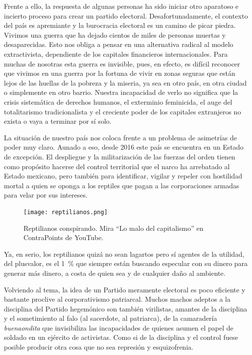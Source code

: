 Frente a ello, la respuesta de algunas personas ha sido iniciar otro aparatoso e incierto proceso para crear un partido electoral. Desafortunadamente, el contexto del país es apremiante y la burocracia electoral es un camino de picar piedra. Vivimos una guerra que ha dejado cientos de miles de personas muertas y desaparecidas. Esto nos obliga a pensar en una alternativa radical al modelo extractivista, dependiente de los capitales financieros internacionales. Para muchas de nosotras esta guerra es invisible, pues, en efecto, es difícil reconocer que vivimos en una guerra por la fortuna de vivir en zonas seguras que están lejos de las huellas de la pobreza y la miseria, ya sea en otro país, en otra ciudad o simplemente en otro barrio. Nuestra incapacidad de verlo no significa que la crisis sistemática de derechos humanos, el exterminio feminicida, el auge del totalitarismo tradicionalista y el creciente poder de los capitales extranjeros no exista o vaya a terminar por sí solo.

La situación de nuestro país nos coloca frente a un problema de asimetrías de poder muy claro. Aunado a eso, desde 2016 este país se encuentra en un Estado de excepción. El despliegue y la militarización de las fuerzas del orden tienen como propósito hacerse del control territorial que el narco ha arrebatado al Estado mexicano, pero también para identificar, vigilar y repeler con hostilidad mortal a quien se oponga a los reptiles que pagan a las corporaciones armadas para velar por sus intereses.

  
\begin{figure}[htbp]
	\centering
	\texttt{[image: reptilianos.png]}
	\caption[Reptilianos conspirando.]{Reptilianos conspirando. Mira \enquote{Lo malo del capitalismo} en ContraPoints de YouTube.}
	\label{fig:reptilianos}
\end{figure}

Ya, en serio, los reptilianos quizá no sean lagartos pero sí agentes de la utilidad, del plusvalor, es el 1~\% que siempre están buscando especular con su dinero para generar más dinero, a costa de quien sea y de cualquier daño al ambiente.

Volviendo al tema, la idea de un Partido meramente electoral es poco eficiente y bastante proclive al corporativismo patriarcal. Muchos machos adeptos a la disciplina del Partido hegemónico son también virilistas, amantes de la disciplina y el sometimiento al falo (al sacerdote, al patriarca), de la camaradería \emph{buenaondita} que invisibiliza las incapacidades de quienes asumen el papel de soldado  en un ejército de activistas. Como si de la disciplina y el control fuese posible producir otra cosa que no sea represión y esquizofrenia.

